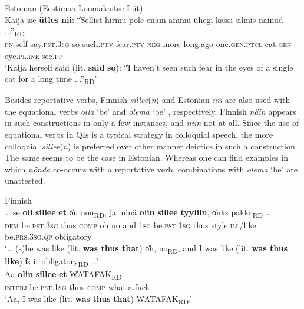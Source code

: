 \documentclass[output=paper,colorlinks,citecolor=brown]{langscibook}
\begin{document}
\ea\label{ex:teptiuk:5}
{Estonian ({Eestimaa Loomakaitse Liit})}\\
\gll Kaija ise \textbf{ütles} \textbf{nii}: \|“Sellist hirmu pole enam ammu ühegi kassi silmis näinud ...”\|\textsubscript{RD}\\
 \textsc{pn} self say.\textsc{pst}.3\textsc{sg} so {\db}{\db}such.\textsc{ptv} fear.\textsc{ptv} \textsc{neg} more long.ago one.\textsc{gen}.\textsc{ptcl} cat.\textsc{gen} eye.\textsc{pl}.\textsc{ine} see.\textsc{pp}\\
\glt ‘Kaija herself said (lit. \textbf{said} \textbf{so}): \|“I haven’t seen such fear in the eyes of a single cat for a long time ...”\|\textsubscript{RD}’
\z

Besides reportative verbs, Finnish \textit{sillee}(\textit{n}) and Estonian \textit{nii} are also used with the equational verbs \textit{olla} ‘be’  and \textit{olema} ‘be’ , respectively. Finnish \textit{näin} appears in such constructions in only a few instances, and \textit{niin} not at all. Since the use of equational verbs in QIs is a typical strategy in colloquial speech, the more colloquial \textit{sillee}(\textit{n}) is preferred over other manner deictics in such a construction. The same seems to be the case in Estonian. Whereas one can find examples in which \textit{nõnda} co-occurs with a reportative verb, combinations with \textit{olema} ‘be’ are unattested.

\ea\label{ex:teptiuk:6} {Finnish} 
 \label{ex:teptiuk:6a}\\
\gll … se \textbf{oli} \textbf{sillee} \textbf{et} \|ou nou\|\textsubscript{RD}, ja minä \textbf{olin} \textbf{sillee} \textbf{tyyliin}, \|onks pakko\|\textsubscript{RD} … \\
 {} \textsc{dem} be.\textsc{pst}.3\textsc{sg} thus \textsc{comp} {\db}oh no and 1\textsc{sg} be.\textsc{pst}.1\textsc{sg} thus style.\textsc{ill}/like {\db}be.\textsc{prs.3sg.qp} obligatory\\
\glt ‘… (s)he was like (lit. \textbf{was thus that}) \|oh, no\|\textsubscript{RD}, and I was like (lit. \textbf{was thus like}) \|is it obligatory\|\textsubscript{RD} …’
 \label{ex:teptiuk:6b}\\
\gll Aa \textbf{olin} \textbf{sillee} \textbf{et} \|WATAFAK\|\textsubscript{RD}.\\
 \textsc{interj} be.\textsc{pst}.1\textsc{sg} thus \textsc{comp} {\db}what.a.fuck\\
\glt ‘Aa, I was like (lit. \textbf{was} \textbf{thus} \textbf{that}) \|WATAFAK\|\textsubscript{RD}.’
\z
\z
\end{document}
